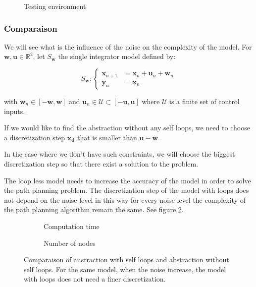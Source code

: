 \documentclass{article}
\begin{document}
\begin{figure}
	
	\caption{Testing environment}
	\label{fig:environment}
\end{figure}

\subsubsection{Comparaison}
We will see what is the influence of the noise on the complexity of the model.
For $\mathbf{w},\mathbf{u} \in \mathbb{R}^2$, let $S_\mathbf{w}$ the single integrator model defined by:

\begin{equation}\label{eqn:sing_int}
S_\mathbf{w}:
\left \{
\begin{array}{ll}
\mathbf{x}_{n+1} &= \mathbf{x}_n + \mathbf{u}_n + \mathbf{w}_n\\
\mathbf{y}_n &= \mathbf{x}_n
\end{array}
\right.
\end{equation}

with $\mathbf{w}_n \in [-\mathbf{w},\mathbf{w}]$ and $\mathbf{u}_n \in \mathcal{U} \subset [-\mathbf{u},\mathbf{u}]$ where $\mathcal{U}$ is a finite set of control inputs.

If we would like to find the abstraction without any self loops, we need to choose a discretization step $\mathbf{x_d}$ that is smaller than $\mathbf{u}-\mathbf{w}$.

In the case where we don't have such constraints, we will choose the biggest discretization step so that there exist a solution to the problem. 

The loop less model needs to increase the accuracy of the model in order to solve the path planning problem.
The discretization step of the model with loops does not depend on the noise level in this way for every noise level the complexity of the path planning algorithm remain the same.
See figure \ref{fig:comp_loops}.

\begin{figure}
    \centering
    \begin{subfigure}[b]{0.49\textwidth}
        
        \caption{Computation time}
    \end{subfigure}
    \begin{subfigure}[b]{0.49\textwidth}
		        		\caption{Number of nodes}
    \end{subfigure}
    \caption{Comparaison of anstraction with self loops and abstraction without self loops. For the same model, when the noise increase, the model with loops does not need a finer discretization.}
    \label{fig:comp_loops}
\end{figure}
\end{document}
